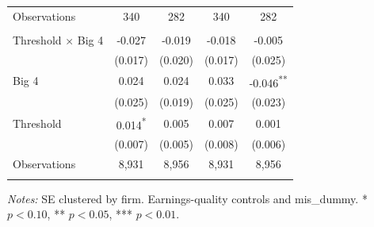 \documentclass[10pt]{article}
\newcommand{\sym}[1]{\textsuperscript{#1}}
\begin{document}
\begin{minipage}{19cm}
\begin{threeparttable}
\begin{tabular}{l c c c c }
Observations & 340 & 282 & 340 & 282 \\
\addlinespace
\multicolumn{5}{l}{\textbf{Panel: Pooled}} \\
Threshold $\times$ Big 4 & -0.027 & -0.019 & -0.018 & -0.005 \\
 & (0.017) & (0.020) & (0.017) & (0.025) \\
Big 4 & 0.024 & 0.024 & 0.033 & -0.046\sym{**} \\
 & (0.025) & (0.019) & (0.025) & (0.023) \\
Threshold & 0.014\sym{*} & 0.005 & 0.007 & 0.001 \\
 & (0.007) & (0.005) & (0.008) & (0.006) \\
Observations & 8,931 & 8,956 & 8,931 & 8,956 \\
\addlinespace
\bottomrule
\end{tabular}
\begin{tablenotes}\fontsize{9}{11}\selectfont
\item \raggedright \fontsize{9}{11}\selectfont \textit{Notes:} SE clustered by firm. Earnings-quality controls and mis\_dummy. * $p<0.10$, ** $p<0.05$, *** $p<0.01$.
\end{tablenotes}
\end{threeparttable}

\end{minipage}
\end{document}
